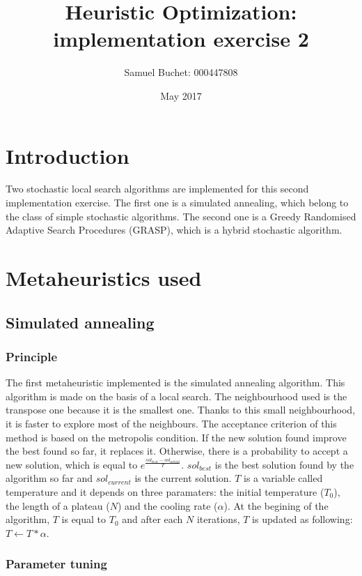 \documentclass{article}
\title{Heuristic Optimization: implementation exercise 2}
\author{Samuel Buchet: 000447808}
\date{May 2017}
\begin{document}
\maketitle

\section{Introduction}

Two stochastic local search algorithms are implemented for this second implementation exercise.
The first one is a simulated annealing, which belong to the class of simple stochastic algorithms.
The second one is a Greedy Randomised Adaptive Search Procedures (GRASP), which is a hybrid stochastic algorithm.

\section{Metaheuristics used}

\subsection{Simulated annealing}

\subsubsection{Principle}

The first metaheuristic implemented is the simulated annealing algorithm.
This algorithm is made on the basis of a local search.
The neighbourhood used is the transpose one because it is the smallest one.
Thanks to this small neighbourhood, it is faster to explore most of the neighbours.
The acceptance criterion of this method is based on the metropolis condition.
If the new solution found improve the best found so far, it replaces it. Otherwise, there is a probability to accept a new solution, which is equal to $e^{ \frac{sol_{best}-sol_{actual}}{T}}$.
$sol_{best}$ is the best solution found by the algorithm so far and $sol_{current}$ is the current solution.
$T$ is a variable called temperature and it depends on three paramaters: the initial temperature ($T_0$), the length of a plateau ($N$) and the cooling rate ($\alpha$).
At the begining of the algorithm, $T$ is equal to $T_0$ and after each $N$ iterations, $T$ is updated as following: $T \leftarrow T*\alpha$.

\subsubsection{Parameter tuning}
\end{document}
